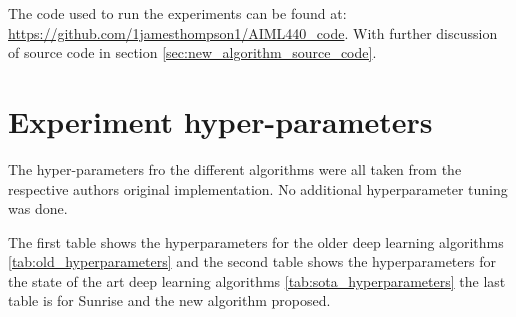 The code used to run the experiments can be found at: \url{https://github.com/1jamesthompson1/AIML440_code}. With further discussion of source code in section \ref{sec:new_algorithm_source_code}.

\section{Experiment hyper-parameters}

The hyper-parameters fro the different algorithms were all taken from the respective authors original implementation. No additional hyperparameter tuning was done.

The first table shows the hyperparameters for the older deep learning algorithms \ref{tab:old_hyperparameters} and the second table shows the hyperparameters for the state of the art deep learning algorithms \ref{tab:sota_hyperparameters} the last table is for Sunrise and the new algorithm proposed.

